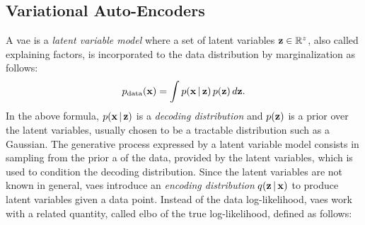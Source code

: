\subsection{Variational Auto-Encoders}
A \gls{vae} \citep{kingma2014vae} is a \emph{latent variable model} where a set of latent variables $\Vector{z} \in \Real^z$, also called explaining factors, is incorporated to the data distribution by marginalization as follows:
$$\PData(\Vector{x}) = \int p(\Vector{x} \given \Vector{z})\,p(\Vector{z})\, d\Vector{z}.$$
In the above formula, $p(\Vector{x} \given \Vector{z})$ is a \emph{decoding distribution} and $p(\Vector{z})$ is a prior over the latent variables, usually chosen to be a tractable distribution such as a Gaussian. The generative process expressed by a latent variable model consists in sampling from the prior a  of the data, provided by the latent variables, which is used to condition the decoding distribution. Since the latent variables are not known in general, \glspl{vae} introduce an \emph{encoding distribution} $q(\Vector{z} \given \Vector{x})$ to produce latent variables given a data point. Instead of the data log-likelihood, \glspl{vae} work with a related quantity, called \gls{elbo} of the true log-likelihood, defined as follows:

